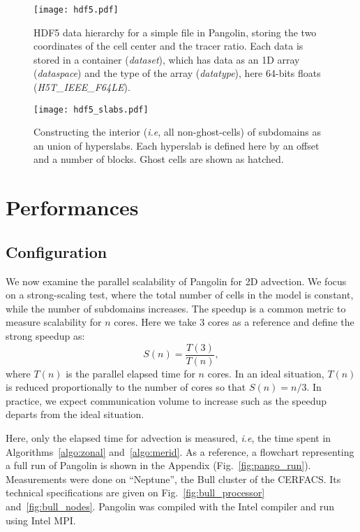 \begin{figure}
  \begin{minipage}{0.49\linewidth}
    \texttt{[image: hdf5.pdf]}
    \caption{HDF5 data hierarchy for a simple file in Pangolin, storing the two
      coordinates of the cell center and the tracer ratio. Each data is stored
      in a container (\textit{dataset}), which has data as an 1D array
      (\textit{dataspace}) and  the type of the array (\textit{datatype}), here
      64-bits floats (\textit{H5T\_IEEE\_F64LE}).}
\label{fig:hdf5}
  \end{minipage}  
  \hfill
  \begin{minipage}{0.45\linewidth}
    \texttt{[image: hdf5\_slabs.pdf]}
    \caption{Constructing the interior (\textit{i.e}, all non-ghost-cells) of subdomains as
    an union of hyperslabs.  Each hyperslab is defined here by an offset and a
  number of blocks. Ghost cells are shown as hatched.}
\label{fig:hdf5_slabs}
  \end{minipage}  
\end{figure}

\section{Performances}
\label{sec:performances}
\subsection{Configuration}
We now examine the parallel scalability of Pangolin for 2D advection. We focus
on a strong-scaling test, where the total number of cells in the model is
constant, while the number of subdomains increases. The speedup is a common metric
to measure scalability for $n$ cores. Here we take 3 cores as a reference and
define the strong speedup as:
\begin{equation}
  S(n) = \frac{T(3)}{T(n)},
\label{eq:speedup}
\end{equation}
where $T(n)$ is the parallel elapsed time for $n$ cores. In an ideal situation,
$T(n)$ is reduced proportionally to the number of cores so that $S(n) = n/3$. In
practice, we expect communication volume to increase such as the speedup departs
from the ideal situation.

Here, only the elapsed time for advection is measured, \textit{i.e}, the time
spent in Algorithms~\ref{algo:zonal} and~\ref{algo:merid}. As a reference, a
flowchart representing a full run of Pangolin is shown in the Appendix
(Fig.~\ref{fig:pango_run}). Measurements were done on ``Neptune'', the Bull
cluster of the CERFACS\@. Its technical specifications are given on
Fig.~\ref{fig:bull_processor} and~\ref{fig:bull_nodes}. Pangolin was compiled
with the Intel compiler and run using Intel MPI\@.
 
